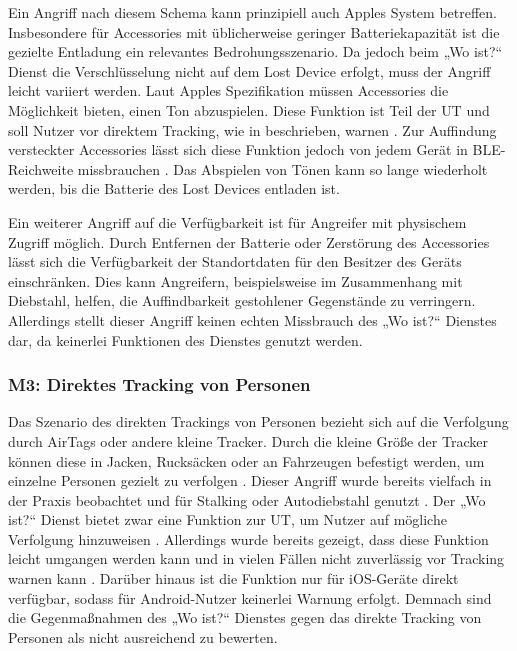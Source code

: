 Ein Angriff nach diesem Schema kann prinzipiell auch Apples System betreffen.
Insbesondere für Accessories mit üblicherweise geringer Batteriekapazität ist die gezielte Entladung ein relevantes Bedrohungsszenario.
Da jedoch beim „Wo ist?“ Dienst die Verschlüsselung nicht auf dem Lost Device erfolgt, muss der Angriff leicht variiert werden.
Laut Apples Spezifikation müssen Accessories die Möglichkeit bieten, einen Ton abzuspielen.
Diese Funktion ist Teil der \ac{UT} und soll Nutzer vor direktem Tracking, wie in  beschrieben, warnen \cite{Apple_FindMySpec}.
Zur Auffindung versteckter Accessories lässt sich diese Funktion jedoch von jedem Gerät in \ac{BLE}-Reichweite missbrauchen \cite{Heinrich_AirGuard}.
Das Abspielen von Tönen kann so lange wiederholt werden, bis die Batterie des Lost Devices entladen ist.

Ein weiterer Angriff auf die Verfügbarkeit ist für Angreifer mit physischem Zugriff möglich.
Durch Entfernen der Batterie oder Zerstörung des Accessories lässt sich die Verfügbarkeit der Standortdaten für den Besitzer des Geräts einschränken.
Dies kann Angreifern, beispielsweise im Zusammenhang mit Diebstahl, helfen, die Auffindbarkeit gestohlener Gegenstände zu verringern.
Allerdings stellt dieser Angriff keinen echten Missbrauch des „Wo ist?“ Dienstes dar, da keinerlei Funktionen des Dienstes genutzt werden.

\subsubsection[M3]{M3: Direktes Tracking von Personen}
\label{missbrauch:3}
Das Szenario des direkten Trackings von Personen bezieht sich auf die Verfolgung durch AirTags oder andere kleine Tracker.
Durch die kleine Größe der Tracker können diese in Jacken, Rucksäcken oder an Fahrzeugen befestigt werden, um einzelne Personen gezielt zu verfolgen \cite{Roth_airtags}.
Dieser Angriff wurde bereits vielfach in der Praxis beobachtet und für Stalking oder Autodiebstahl genutzt \cite{NYT_Airtags}.
Der „Wo ist?“ Dienst bietet zwar eine Funktion zur \ac{UT}, um Nutzer auf mögliche Verfolgung hinzuweisen \cite{Apple_FindMySpec}.
Allerdings wurde bereits gezeigt, dass diese Funktion leicht umgangen werden kann \cite{Mayberry_Tracking} und in vielen Fällen nicht zuverlässig vor Tracking warnen kann \cite{Heinrich_AirGuard}.
Darüber hinaus ist die Funktion nur für iOS-Geräte direkt verfügbar, sodass für Android-Nutzer keinerlei Warnung erfolgt.
Demnach sind die Gegenmaßnahmen des „Wo ist?“ Dienstes gegen das direkte Tracking von Personen als nicht ausreichend zu bewerten.



